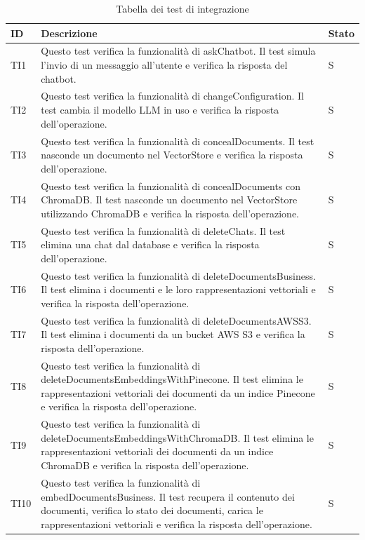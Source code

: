 \documentclass[10pt, a4paper]{article}
\begin{document}
    \renewcommand{\arraystretch}{1.5}
    \begin{xltabular}{\textwidth}{p{0.12\textwidth}|p{0.7\textwidth}|X}
    \caption{Tabella dei test di integrazione}
    \label{tab:test_integrazione}\\
    \textbf{ID} & \textbf{Descrizione} & \textbf{Stato}  \\
    \hline
    TI1 & Questo test verifica la funzionalità di askChatbot. Il test simula l'invio di un messaggio all'utente e verifica la risposta del chatbot. & S \\
    \hline
    TI2 & Questo test verifica la funzionalità di changeConfiguration. Il test cambia il modello LLM in uso e verifica la risposta dell'operazione. & S \\
    \hline
    TI3 & Questo test verifica la funzionalità di concealDocuments. Il test nasconde un documento nel VectorStore e verifica la risposta dell'operazione. & S \\
    \hline
    TI4 & Questo test verifica la funzionalità di concealDocuments con ChromaDB. Il test nasconde un documento nel VectorStore utilizzando ChromaDB e verifica la risposta dell'operazione. & S \\
    \hline
    TI5 & Questo test verifica la funzionalità di deleteChats. Il test elimina una chat dal database e verifica la risposta dell'operazione. & S \\
    \hline
    TI6 & Questo test verifica la funzionalità di deleteDocumentsBusiness. Il test elimina i documenti e le loro rappresentazioni vettoriali e verifica la risposta dell'operazione. & S \\
    \hline
    TI7 & Questo test verifica la funzionalità di deleteDocumentsAWSS3. Il test elimina i documenti da un bucket AWS S3 e verifica la risposta dell'operazione. & S \\
    \hline
    TI8 & Questo test verifica la funzionalità di deleteDocumentsEmbeddingsWithPinecone. Il test elimina le rappresentazioni vettoriali dei documenti da un indice Pinecone e verifica la risposta dell'operazione. & S \\
    \hline
    TI9 & Questo test verifica la funzionalità di deleteDocumentsEmbeddingsWithChromaDB. Il test elimina le rappresentazioni vettoriali dei documenti da un indice ChromaDB e verifica la risposta dell'operazione. & S \\
    \hline
    TI10 & Questo test verifica la funzionalità di embedDocumentsBusiness. Il test recupera il contenuto dei documenti, verifica lo stato dei documenti, carica le rappresentazioni vettoriali e verifica la risposta dell'operazione. & S \\

\end{xltabular}
\end{document}
